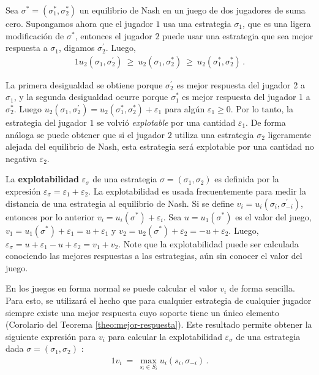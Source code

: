 Sea $\sigma^* = (\sigma^*_1, \sigma^*_2)$ un equilibrio de Nash en un juego de dos jugadores de suma cero. Supongamos ahora que el jugador $1$  usa una estrategia $\sigma_1$, que es una ligera modificación de $\sigma^*$, entonces el jugador $2$ puede usar una estrategia que sea mejor respuesta a $\sigma_1$, digamos $\sigma^{\prime}_2$. Luego,
\begin{alignat}{1}
u_2(\sigma_1, \sigma^{\prime}_2)\ \geq\ u_2(\sigma_1, \sigma^*_2)\ \geq\ u_2(\sigma^*_1, \sigma^*_2) \,.
\end{alignat}

La primera desigualdad se obtiene porque $\sigma^{\prime}_2$ es mejor respuesta del jugador 2 a $\sigma_1$, y la segunda desigualdad ocurre porque $\sigma^*_1$ es mejor respuesta del jugador 1 a $\sigma^*_2$. Luego $u_2(\sigma_1, \sigma^{\prime}_2) = u_2(\sigma^*_1, \sigma^*_2) + \varepsilon_1$ para algún $\varepsilon_1 \geq 0$. Por lo tanto, la estrategia del jugador $1$ se volvió \textit{explotable} por una cantidad $\varepsilon_1$. De forma análoga se puede obtener que si el jugador $2$ utiliza una estrategia $\sigma_2$ ligeramente alejada del equilibrio de Nash, esta estrategia será explotable por una cantidad no negativa $\varepsilon_2$.

La \textbf{explotabilidad} \cite[p. 7]{bib:thesis-marc-lanctot} $\varepsilon_\sigma$ de una estrategia $\sigma = (\sigma_1, \sigma_2)$ es definida por la expresión $\varepsilon_{\sigma} = \varepsilon_1 + \varepsilon_2$. La explotabilidad es usada frecuentemente para medir la distancia de una estrategia al equilibrio de Nash. Si se define $v_i = u_i(\sigma_i, \sigma^{\prime}_{-i})$, entonces por lo anterior $v_i = u_i(\sigma^*) + \varepsilon_i$. Sea $u=u_1(\sigma^*)$ es el valor del juego,  $v_1 = u_1(\sigma^*) + \varepsilon_1 = u + \varepsilon_1$ y $v_2 = u_2(\sigma^*) + \varepsilon_2 = -u + \varepsilon_2$. Luego, $\varepsilon_{\sigma} = u + \varepsilon_1 - u + \varepsilon_2 =  v_1 + v_2$. Note que la explotabilidad puede ser calculada conociendo las mejores respuestas a las estrategias, aún sin conocer el valor del juego.

En los juegos en forma normal se puede calcular el valor $v_i$ de forma sencilla. Para esto, se utilizará el hecho que para cualquier estrategia de cualquier jugador siempre existe una mejor respuesta cuyo soporte tiene un único elemento (Corolario del Teorema \ref{theo:mejor-respuesta}). Este resultado permite obtener la siguiente expresión para $v_i$ para calcular la explotabilidad $\varepsilon_\sigma$ de una estrategia dada $\sigma=(\sigma_1,\sigma_2)$ \cite[p.~60]{bib:thesis-marc-lanctot}:
\begin{alignat}{1}
\label{eq:best-response-fn}
v_i\ =\ \max_{s_{i} \in S_{i}} u_i(s_i, \sigma_{-i}) \,.
\end{alignat}

